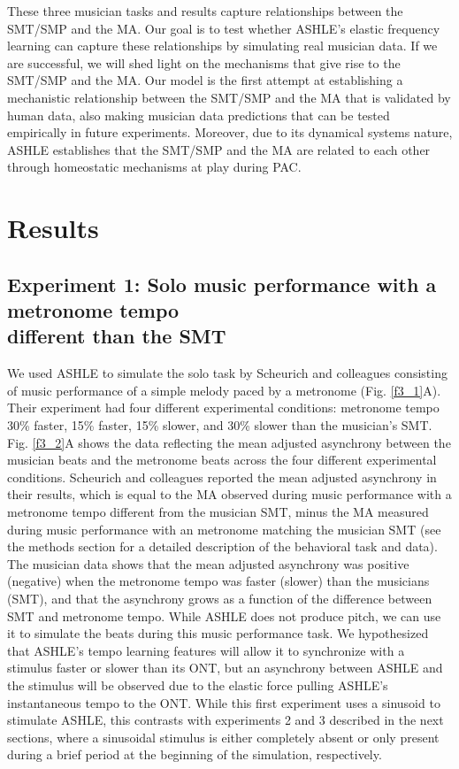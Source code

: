 \documentclass{report}
\begin{document}
These three musician tasks and results capture relationships between the SMT/SMP and the MA. Our goal is to test whether ASHLE's elastic frequency learning can capture these relationships by simulating real musician data. If we are successful, we will shed light on the mechanisms that give rise to the SMT/SMP and the MA. Our model is the first attempt at establishing a mechanistic relationship between the SMT/SMP and the MA that is validated by human data, also making musician data predictions that can be tested empirically in future experiments. Moreover, due to its dynamical systems nature, ASHLE establishes that the SMT/SMP and the MA are related to each other through homeostatic mechanisms at play during PAC.

\section{Results}

\subsection{Experiment 1: Solo music performance with a metronome tempo \\ different than the SMT}

We used ASHLE to simulate the solo task by Scheurich and colleagues \cite{scheurich2018tapping} consisting of music performance of a simple melody paced by a metronome (Fig.{} \ref{f3_1}A). Their experiment had four different experimental conditions: metronome tempo 30\% faster, 15\% faster, 15\% slower, and 30\% slower than the musician's SMT. Fig.{} \ref{f3_2}A shows the data reflecting the mean adjusted asynchrony between the musician beats and the metronome beats across the four different experimental conditions. Scheurich and colleagues \cite{scheurich2018tapping} reported the mean adjusted asynchrony in their results, which is equal to the MA observed during music performance with a metronome tempo different from the musician SMT, minus the MA measured during music performance with an metronome matching the musician SMT (see the methods section for a detailed description of the behavioral task and data). The musician data shows that the mean adjusted asynchrony was positive (negative) when the metronome tempo was faster (slower) than the musicians (SMT), and that the asynchrony grows as a function of the difference between SMT and metronome tempo. While ASHLE does not produce pitch, we can use it to simulate the beats during this music performance task. We hypothesized that ASHLE's tempo learning features will allow it to synchronize with a stimulus faster or slower than its ONT, but an asynchrony between ASHLE and the stimulus will be observed due to the elastic force pulling ASHLE's instantaneous tempo to the ONT. While this first experiment uses a sinusoid to stimulate ASHLE, this contrasts with experiments 2 and 3 described in the next sections, where a sinusoidal stimulus is either completely absent or only present during a brief period at the beginning of the simulation, respectively.
\end{document}
